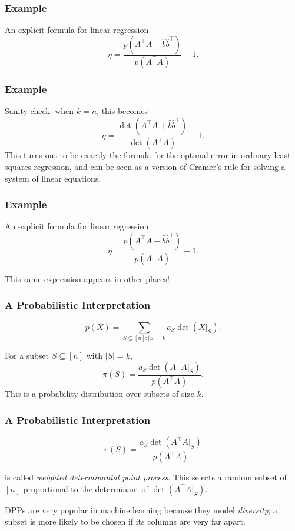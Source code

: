 \documentclass{beamer}
\begin{document}
\begin{frame}
    \frametitle{Example}
    \begin{block}{An explicit formula for linear regression}
        \[
            \eta = \frac{p(A^{\intercal}A+\hat{b}\hat{b}^{\intercal})}{p(A^{\intercal}A)} - 1.
        \]
    \end{block}
\end{frame}
\begin{frame}
    \frametitle{Example}
    Sanity check: when $k = n$, this becomes
    \[
        \eta = \frac{\det(A^{\intercal}A+\hat{b}\hat{b}^{\intercal})}{\det(A^{\intercal}A)} - 1.
    \]
    \pause
    This turns out to be exactly the formula for the optimal error in ordinary least squares regression, and can be seen as a version of Cramer's rule for solving a system of linear equations.
\end{frame}
\begin{frame}
    \frametitle{Example}
    \begin{block}{An explicit formula for linear regression}
        \[
            \eta = \frac{p(A^{\intercal}A+\hat{b}\hat{b}^{\intercal})}{p(A^{\intercal}A)} - 1.
        \]
    \end{block}
    \pause
    This same expression appears in other places!
\end{frame}
\begin{frame}
    \frametitle{A Probabilistic Interpretation}
    \[
        p(X) = \sum_{S \subseteq [n] : |S| = k} a_S\det(X|_S).
    \]
    
    \pause
    For a subset $S \subseteq [n]$ with $|S| = k$,
    \[
        \pi(S) = \frac{a_S\det(A^{\intercal}A|_S)}{p(A^{\intercal}A)}.
    \]
    This is a probability distribution over subsets of size $k$.
\end{frame}
\begin{frame}
    \frametitle{A Probabilistic Interpretation}
    \[
        \pi(S) = \frac{a_S\det(A^{\intercal}A|_S)}{p(A^{\intercal}A)}
    \]
    
     is called \emph{weighted determinantal point process}. This selects a random subset of $[n]$ proportional to the determinant of $\det(A^{\intercal}A|_S)$.

     \pause 
     DPPs are very popular in machine learning because they model \emph{diversity}; a subset is more likely to be chosen if its columns are very far apart.
\end{frame}
\end{document}
